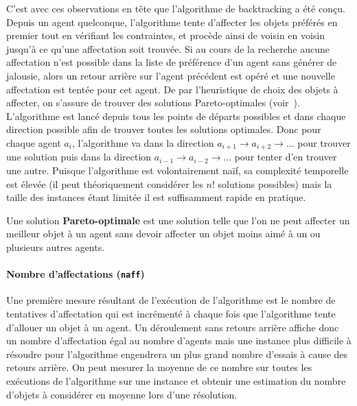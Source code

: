 \documentclass[../main.tex]{subfiles}
\begin{document}
	C'est avec ces observations en tête que l'algorithme de backtracking a été conçu. Depuis un agent quelconque, l'algorithme tente d'affecter les objets préférés en premier tout en vérifiant les contraintes, et procède ainsi de voisin en voisin jusqu'à ce qu'une affectation soit trouvée. Si au cours de la recherche aucune affectation n'est possible dans la liste de préférence d'un agent sans générer de jalousie, alors un retour arrière sur l'agent précédent est opéré et une nouvelle affectation est tentée pour cet agent. De par l'heuristique de choix des objets à affecter, on s'assure de trouver des solutions Pareto-optimales (voir~). L'algorithme est lancé depuis tous les points de départs possibles et dans chaque direction possible afin de trouver toutes les solutions optimales. Donc pour chaque agent $a_i$, l'algorithme va dans la direction $a_{i+1} \rightarrow a_{i+2} \rightarrow ...$ pour trouver une solution puis dans la direction $a_{i-1} \rightarrow a_{i-2} \rightarrow ...$ pour tenter d'en trouver une autre. Puisque l'algorithme est volontairement naïf, sa complexité temporelle est élevée (il peut théoriquement considérer les $n!$ solutions possibles) mais la taille des instances étant limitée il est suffisamment rapide en pratique.
	
	\begin{definition}
	\label{pareto-def}
	    Une solution \textbf{Pareto-optimale} est une solution telle que l'on ne peut affecter un meilleur objet à un agent sans devoir affecter un objet moins aimé à un ou plusieurs autres agents. 
	\end{definition}
	
	\paragraph{Nombre d'affectations (\texttt{naff})}{Une première mesure résultant de l'exécution de l'algorithme est le nombre de tentatives d'affectation qui est incrémenté à chaque fois que l'algorithme tente d'allouer un objet à un agent. Un déroulement sans retours arrière affiche donc un nombre d'affectation égal au nombre d'agents mais une instance plus difficile à résoudre pour l'algorithme engendrera un plus grand nombre d'essais à cause des retours arrière. On peut mesurer la moyenne de ce nombre sur toutes les exécutions de l'algorithme sur une instance et obtenir une estimation du nombre d'objets à considérer en moyenne lors d'une résolution.}
	
\end{document}

